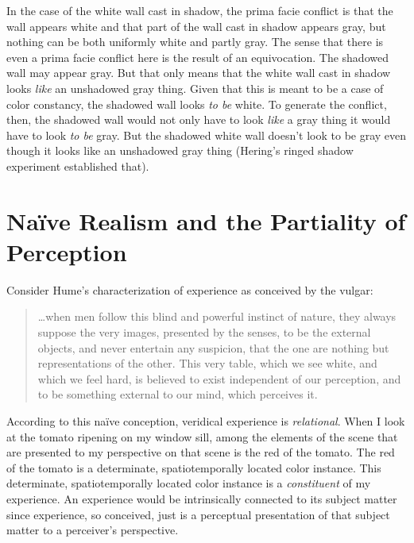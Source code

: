 \documentclass[12pt]{article}
\begin{document}
In the case of the white wall cast in shadow, the prima facie conflict is that the wall appears white and that part of the wall cast in shadow appears gray, but nothing can be both uniformly white and partly gray. The sense that there is even a prima facie conflict here is the result of an equivocation. The shadowed wall may appear gray. But that only means that the white wall cast in shadow looks \emph{like} an unshadowed gray thing. Given that this is meant to be a case of color constancy, the shadowed wall looks \emph{to be} white. To generate the conflict, then, the shadowed wall would not only have to look \emph{like} a gray thing it would have to look \emph{to be} gray. But the shadowed white wall doesn't look to be gray even though it looks like an unshadowed gray thing (Hering's ringed shadow experiment established that).


\section{Naïve Realism and the Partiality of Perception} %
\label{sec:naïve_realism_and_the_partiality_of_perception}

Consider Hume's characterization of experience as conceived by the vulgar:
\begin{quote}
    \ldots when men follow this blind and powerful instinct of nature, they always suppose the very images, presented by the senses, to be the external objects, and never entertain any suspicion, that the one are nothing but representations of the other. This very table, which we see white, and which we feel hard, is believed to exist independent of our perception, and to be something external to our mind, which perceives it. \citep[113--4]{Hume:1740lr}
\end{quote}
According to this naïve conception, veridical experience is \emph{relational}. When I look at the tomato ripening on my window sill, among the elements of the scene that are presented to my perspective on that scene is the red of the tomato. The red of the tomato is a determinate, spatiotemporally located color instance. This determinate, spatiotemporally located color instance is a \emph{constituent} of my experience. An experience would be intrinsically connected to its subject matter since experience, so conceived, just is a perceptual presentation of that subject matter to a perceiver's perspective.
\end{document}
